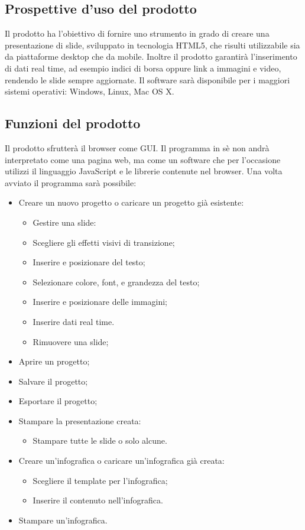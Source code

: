 \subsection{Prospettive d'uso del prodotto}
Il prodotto ha l'obiettivo di fornire uno strumento in grado di creare una presentazione di slide, sviluppato in tecnologia HTML5, che risulti utilizzabile sia da piattaforme desktop che da mobile. Inoltre il prodotto garantirà l'inserimento di dati real time, ad esempio indici di borsa oppure link a immagini e video, rendendo le slide sempre aggiornate. Il software sarà disponibile per i maggiori sistemi operativi: Windows, Linux, Mac OS X.

\subsection{Funzioni del prodotto}
Il prodotto sfrutterà il browser come GUI. Il programma in sè non andrà interpretato come una pagina web, ma come un software che per l'occasione utilizzi il linguaggio JavaScript e le librerie contenute nel browser.
Una volta avviato il programma sarà possibile:
\begin{itemize}
	\item Creare un nuovo progetto o caricare un progetto già esistente:
	\begin{itemize}
		\item Gestire una slide:
		\item Scegliere gli effetti visivi di transizione;
		\item Inserire e posizionare del testo;
		\item Selezionare colore, font, e grandezza del testo;
		\item Inserire e posizionare delle immagini;
		\item Inserire dati real time.
		\item Rimuovere una slide;
	\end{itemize}
	\item Aprire un progetto;
	\item Salvare il progetto;
	\item Esportare il progetto;
	\item Stampare la presentazione creata:
	\begin{itemize}
		\item Stampare tutte le slide o solo alcune.
	\end{itemize}
	\item Creare un'infografica o caricare un'infografica già creata:
	\begin{itemize}
		\item Scegliere il template per l'infografica;
		\item Inserire il contenuto nell'infografica.
	\end{itemize}
	\item Stampare un'infografica.
\end{itemize}

